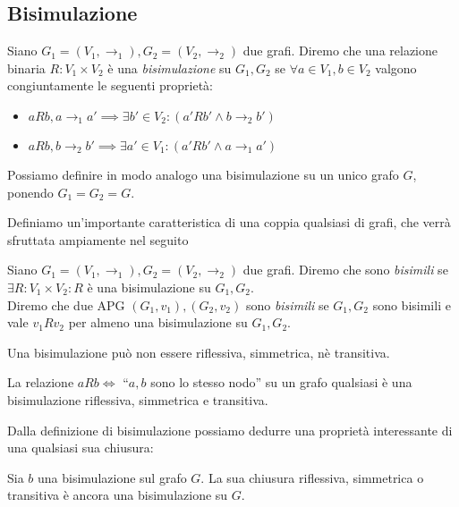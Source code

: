 \subsection{Bisimulazione}
\begin{definition}
    Siano $G_1 = (V_1,\to_1), G_2 = (V_2,\to_2)$ due grafi. Diremo che una relazione binaria $R: V_1 \times V_2$ è una \emph{bisimulazione} su $G_1, G_2$ se $\forall a \in V_1, b \in V_2$ valgono congiuntamente le seguenti proprietà:
    \begin{itemize}
        \item $a R b, a \to_1 a' \implies \exists b' \in V_2 : (a' R b' \land b \to_2 b')$
        \item $a R b, b \to_2 b' \implies \exists a' \in V_1 : (a' R b' \land a \to_1 a')$
    \end{itemize}
    Possiamo definire in modo analogo una bisimulazione su un unico grafo $G$, ponendo $G_1 = G_2 = G$.
\end{definition}
Definiamo un'importante caratteristica di una coppia qualsiasi di grafi, che verrà sfruttata ampiamente nel seguito
\begin{definition}
    Siano $G_1 = (V_1,\to_1), G_2 = (V_2,\to_2)$ due grafi. Diremo che sono \emph{bisimili} se $\exists R: V_1 \times V_2 : R$ è una bisimulazione su $G_1, G_2$.\\
    Diremo che due APG $(G_1, v_1), (G_2, v_2)$ sono \emph{bisimili} se $G_1, G_2$ sono bisimili e vale $v_1 R v_2$ per almeno una bisimulazione su $G_1, G_2$.
\end{definition}
\begin{observation}
    Una bisimulazione può non essere riflessiva, simmetrica, nè transitiva.
\end{observation}
\begin{example}
    La relazione $a R b \iff$ ``$a,b$ sono lo stesso nodo'' su un grafo qualsiasi è una bisimulazione riflessiva, simmetrica e transitiva.
\end{example}
Dalla definizione di bisimulazione possiamo dedurre una proprietà interessante di una qualsiasi sua chiusura:
\begin{theorem}
    Sia $b$ una bisimulazione sul grafo $G$. La sua chiusura riflessiva, simmetrica o transitiva è ancora una bisimulazione su $G$.
\end{theorem}
